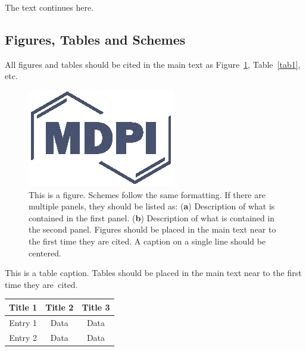 \begin{paracol}{2}
The text continues here. 

\subsection{Figures, Tables and Schemes}

All figures and tables should be cited in the main text as Figure~\ref{fig1}, Table~\ref{tab1}, etc.

\begin{figure}[H]
\includegraphics[width=10.5 cm]{Definitions/logo-mdpi}
\caption{This is a figure. Schemes follow the same formatting. If there are multiple panels, they should be listed as: (\textbf{a}) Description of what is contained in the first panel. (\textbf{b}) Description of what is contained in the second panel. Figures should be placed in the main text near to the first time they are cited. A caption on a single line should be centered.\label{fig1}}
\end{figure}   

\begin{specialtable}[H] 
\caption{This is a table caption. Tables should be placed in the main text near to the first time they are~cited.\label{tab1}}
\begin{tabular}{ccc}
\toprule
\textbf{Title 1}	& \textbf{Title 2}	& \textbf{Title 3}\\
\midrule
Entry 1		& Data			& Data\\
Entry 2		& Data			& Data\\
\bottomrule
\end{tabular}
\end{specialtable}



\end{paracol}

